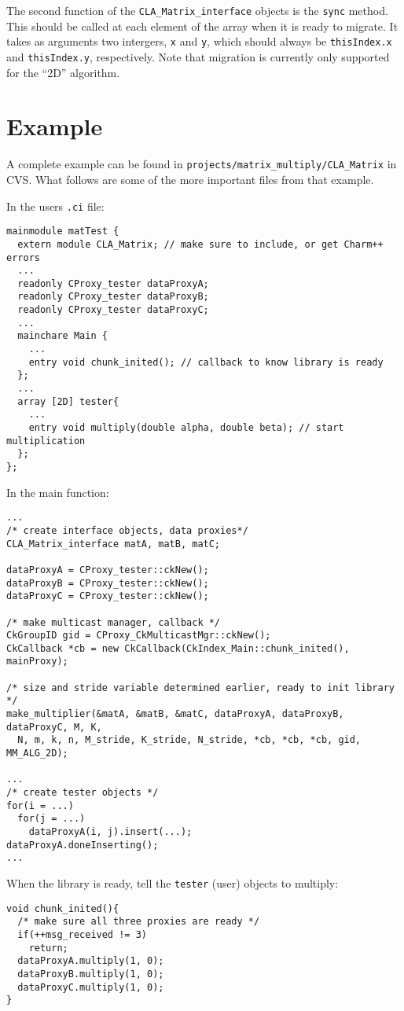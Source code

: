 The second function of the {\tt CLA\_Matrix\_interface} objects is the
{\tt sync} method. This should be called at each element of the array when it
is ready to migrate. It takes as arguments two intergers, {\tt x} and {\tt y},
which should always be {\tt thisIndex.x} and {\tt thisIndex.y}, respectively.
Note that migration is currently only supported for the ``2D'' algorithm.

\section{Example}
A complete example can be found in {\tt projects/matrix\_multiply/CLA\_Matrix}
in CVS. What follows are some of the more important files from that example.

In the users {\tt .ci} file:
\begin{verbatim}
mainmodule matTest {
  extern module CLA_Matrix; // make sure to include, or get Charm++ errors
  ...
  readonly CProxy_tester dataProxyA;
  readonly CProxy_tester dataProxyB;
  readonly CProxy_tester dataProxyC;
  ...
  mainchare Main {
    ...
    entry void chunk_inited(); // callback to know library is ready
  };
  ...
  array [2D] tester{
    ...
    entry void multiply(double alpha, double beta); // start multiplication
  };
};
\end{verbatim}

In the main function:
\begin{verbatim}
...
/* create interface objects, data proxies*/
CLA_Matrix_interface matA, matB, matC;

dataProxyA = CProxy_tester::ckNew();
dataProxyB = CProxy_tester::ckNew();
dataProxyC = CProxy_tester::ckNew();

/* make multicast manager, callback */
CkGroupID gid = CProxy_CkMulticastMgr::ckNew();
CkCallback *cb = new CkCallback(CkIndex_Main::chunk_inited(), mainProxy);

/* size and stride variable determined earlier, ready to init library */
make_multiplier(&matA, &matB, &matC, dataProxyA, dataProxyB, dataProxyC, M, K,
  N, m, k, n, M_stride, K_stride, N_stride, *cb, *cb, *cb, gid, MM_ALG_2D);

...
/* create tester objects */
for(i = ...)
  for(j = ...)
    dataProxyA(i, j).insert(...);
dataProxyA.doneInserting();
...
\end{verbatim}

When the library is ready, tell the {\tt tester} (user) objects to multiply:
\begin{verbatim}
void chunk_inited(){
  /* make sure all three proxies are ready */
  if(++msg_received != 3)
    return;
  dataProxyA.multiply(1, 0);
  dataProxyB.multiply(1, 0);
  dataProxyC.multiply(1, 0);
}
\end{verbatim}

